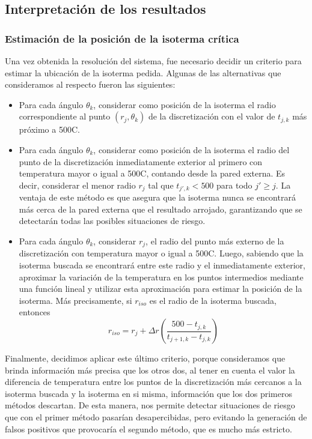     \subsection{Interpretación de los resultados}

        \subsubsection{Estimación de la posición de la isoterma crítica}

            Una vez obtenida la resolución del sistema, fue necesario decidir un criterio para estimar la ubicación de la isoterma pedida. Algunas de las alternativas que consideramos al respecto fueron las siguientes:

            \begin{itemize}
                \item Para cada ángulo $\theta_k$, considerar como posición de la isoterma el radio correspondiente al punto $(r_j, \theta_k)$ de la discretización con el valor de $t_{j,k}$ más próximo a 500{\degree}C.
                \item Para cada ángulo $\theta_k$, considerar como posición de la isoterma el radio del punto de la discretización inmediatamente exterior al primero con temperatura mayor o igual a 500{\degree}C, contando desde la pared externa. Es decir, considerar el menor radio $r_j$ tal que $t_{j',k} < 500$ para todo $j' \geq j$. La ventaja de este método es que asegura que la isoterma nunca se encontrará más cerca de la pared externa que el resultado arrojado, garantizando que se detectarán todas las posibles situaciones de riesgo.
                \item Para cada ángulo $\theta_k$, considerar $r_j$, el radio del punto más externo de la discretización con temperatura mayor o igual a 500{\degree}C. Luego, sabiendo que la isoterma buscada se encontrará entre este radio y el inmediatamente exterior, aproximar la variación de la temperatura en los puntos intermedios mediante una función lineal y utilizar esta aproximación para estimar la posición de la isoterma. Más precisamente, si $r_{iso}$ es el radio de la isoterma buscada, entonces
                    \[ r_{iso} = r_j + \Delta r \left(\frac{500 - t_{j,k}}{t_{j+1,k} - t_{j,k}} \right) \]
            \end{itemize}

            Finalmente, decidimos aplicar este último criterio, porque consideramos que brinda información más precisa que los otros dos, al tener en cuenta el valor la diferencia de temperatura entre los puntos de la discretización más cercanos a la isoterma buscada y la isoterma en si misma, información que los dos primeros métodos descartan. De esta manera, nos permite detectar situaciones de riesgo que con el primer método pasarían desapercibidas, pero evitando la generación de falsos positivos que provocaría el segundo método, que es mucho más estricto.

